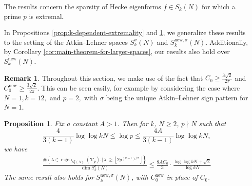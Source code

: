 \documentclass[11pt,letterpaper,reqno]{amsart}
\newtheorem{proposition}[theorem]{Proposition}
\theoremstyle{definition}
\newtheorem{remark}[theorem]{Remark}
\numberwithin{equation}{section}
\numberwithin{figure}{section}
\numberwithin{table}{section}
\newcommand{\nw}{\mathrm{new}}
\begin{document}
The results \cite[Theorems 2.3 and 2.4]{Kim24} concern the sparsity of Hecke eigenforms $f \in S_k(N)$ for which a prime $p$ is extremal.

In Propositions \ref{prop:k-dependent-extremality} and \ref{prop:N-dependent-extremality}, we generalize these results to the setting of the Atkin--Lehner spaces $S_k^\sigma(N)$ and $S_k^{\nw, \sigma}(N).$ Additionally, by Corollary \ref{cor:main-theorem-for-larger-spaces}, our results also hold over $S_k^{\nw}(N)$.

\begin{remark}
    Throughout this section, we make use of the fact that $C_0 \geq \frac{3\sqrt{2}}{2\pi}$ and $C_0^\nw \geq \frac{3\sqrt{2}}{2\pi}.$ This can be seen easily, for example by considering the case where $N = 1, k = 12,$ and $p = 2,$ with $\sigma$ being the unique Atkin--Lehner sign pattern for $N = 1$. 
\end{remark}

\begin{proposition} \label{prop:N-dependent-extremality}
    Fix a constant $A > 1$. Then for $k$, $N \geq 2$,  $p \nmid N$ such that
    $$\frac{4}{3(k - 1)} \log\log  kN \leq \log p \leq \frac{4A}{3(k - 1)} \log\log  kN,$$ 
    we have
    \begin{align}
        \frac{\#\left\{ \lambda \in \operatorname{eigen}_{ S_k^\sigma(N)} \! \left( \mathbf{T}_{p}  \right) : |\lambda| \geq \left\lfloor 2 p^{(k - 1)/2}  \right\rfloor \right\}}{\dim S_k^\sigma(N)} \leq \frac{8A C_0}{3} \cdot \frac{\log \log  kN + \sqrt{2}}{\log  kN}
    \end{align}
    The same result also holds for $S_k^{\nw, \sigma}(N)$, with $C_0^\nw$ in place of $C_0$.
\end{proposition}
\end{document}
